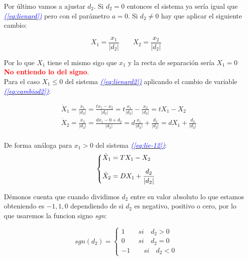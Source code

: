 \documentclass[12pt,a4paper]{report} %
\newcommand{\eref}[1]{\hyperref[#1]{\textcolor{blue}{\textit{(\ref*{#1})}}}}
\begin{document}
	Por último vamos a ajustar $d_2$. Si $d_2=0$ entonces el sistema ya sería igual que \eref{eq:lienard} pero con el parámetro $a=0$. Si $d_2\neq0$ hay que aplicar el siguiente cambio:
	
	\begin{equation}
		\label{eq:cambiod2}
		X_1=\frac{x_1}{|d_2|} \qquad X_2=\frac{x_2}{|d_2|}
	\end{equation}\smallskip
	
	Por lo que $X_1$ tiene el mismo sigo que $x_1$ y la recta de separación sería $X_1=0$ \textbf{\textcolor{red}{No entiendo lo del signo}}.\\[0.5cm]
	Para el caso $X_1\leq 0$ del sistema \eref{eq:lienard2} aplicando el cambio de variable \eref{eq:cambiod2}:
	
	\begin{equation}
		\label{eq:q3}
		\begin{aligned}
			&\dot{X}_1=\frac{\dot{x}_1}{|d_2|}=\frac{tx_1-x_2}{|d_2|}=t\frac{x_1}{|d_2|}-\frac{x_2}{|d_2|}=tX_1-X_2\\[2mm]
			&\dot{X}_2=\frac{\dot{x}_2}{|d_2|}=\frac{dx_1-0+d_2}{|d_2|}=d\frac{x_1}{|d_2|}+\frac{d_2}{|d_2|}=dX_1+\frac{d_2}{|d_2|}\\[2mm]
		\end{aligned}
	\end{equation}\smallskip
	
	De forma análoga para $x_1>0$ del sistema \eref{eq:lie-12}:
	\begin{equation}
		\label{eq:q4}
		\scalebox{1}{$\displaystyle
			\left\{
			\begin{aligned}
				&\dot{X}_1=TX_1-X_2 \\[2mm]
				&\dot{X}_2=DX_1+\frac{d_2}{|d_2|}
			\end{aligned}
			\right.
			$}
	\end{equation}\smallskip
	
	Démonos cuenta que cuando dividimos $d_2$ entre su valor absoluto lo que estamos obteniendo es $-1,1,0$ dependiendo de si $d_2$ es negativo, positivo o cero, por lo que usaremos la funcion signo \textit{sgn}:
	
	\begin{equation}
		\label{eq:sgn}
		sgn(d_2)=\left\{
		\begin{aligned}
		1 \qquad si  \quad d_2>0 \\
		0 \qquad si  \quad d_2=0 \\
		-1 \qquad si \quad d_2<0 
    	\end{aligned}
		\right.
	\end{equation}\smallskip
	
\end{document}
